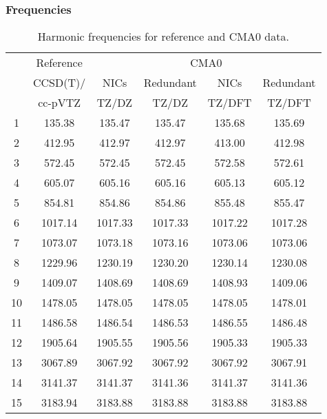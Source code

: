 \documentclass[10pt,oneside]{article}
\begin{document}
\begin{table}[h!]
\subsubsection*{Frequencies}
\centering
\caption{Harmonic frequencies for reference and CMA0 data.}
\begin{tabular}{cccccc}
\toprule
{} & Reference & \multicolumn{4}{c}{CMA0} \\
{} &  CCSD(T)/ &    NICs &  Redundant &    NICs & Redundant \\
{} &   cc-pVTZ &   TZ/DZ &      TZ/DZ &  TZ/DFT &    TZ/DFT \\
\midrule
1  &    135.38 &  135.47 &     135.47 &  135.68 &    135.69 \\
2  &    412.95 &  412.97 &     412.97 &  413.00 &    412.98 \\
3  &    572.45 &  572.45 &     572.45 &  572.58 &    572.61 \\
4  &    605.07 &  605.16 &     605.16 &  605.13 &    605.12 \\
5  &    854.81 &  854.86 &     854.86 &  855.48 &    855.47 \\
6  &   1017.14 & 1017.33 &    1017.33 & 1017.22 &   1017.28 \\
7  &   1073.07 & 1073.18 &    1073.16 & 1073.06 &   1073.06 \\
8  &   1229.96 & 1230.19 &    1230.20 & 1230.14 &   1230.08 \\
9  &   1409.07 & 1408.69 &    1408.69 & 1408.93 &   1409.06 \\
10 &   1478.05 & 1478.05 &    1478.05 & 1478.05 &   1478.01 \\
11 &   1486.58 & 1486.54 &    1486.53 & 1486.55 &   1486.48 \\
12 &   1905.64 & 1905.55 &    1905.56 & 1905.33 &   1905.33 \\
13 &   3067.89 & 3067.92 &    3067.92 & 3067.92 &   3067.91 \\
14 &   3141.37 & 3141.37 &    3141.36 & 3141.37 &   3141.36 \\
15 &   3183.94 & 3183.88 &    3183.88 & 3183.88 &   3183.88 \\
\bottomrule
\end{tabular}
\end{table}
\end{document}
